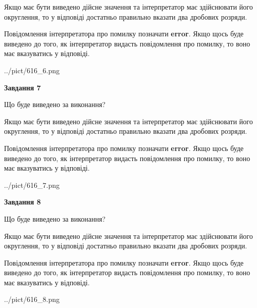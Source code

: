\documentclass[12pt, ukrainian]{article}
\begin{document}
{\begin {Large}
Якщо має бути виведено дійсне значення та інтерпретатор має здійснювати його округлення, 
то у відповіді достатньо правильно вказати два дробових розряди.

Повідомлення інтерпретатора про помилку позначати \textbf{error}.
Якщо щось буде виведено до того, як інтерпретатор видасть повідомлення про помилку, 
то воно має вказуватись у відповіді. \par

\begin{center}
	{../pict/616_6.png}
\end{center}
\newpage

{\begin {center}\textbf{Завдання 7}\end {center}}\par
Що буде виведено за виконання? \par

Якщо має бути виведено дійсне значення та інтерпретатор має здійснювати його округлення, 
то у відповіді достатньо правильно вказати два дробових розряди.

Повідомлення інтерпретатора про помилку позначати \textbf{error}.
Якщо щось буде виведено до того, як інтерпретатор видасть повідомлення про помилку, 
то воно має вказуватись у відповіді. \par

\begin{center}
	{../pict/616_7.png}
\end{center}
\newpage

{\begin {center}\textbf{Завдання 8}\end {center}}\par
Що буде виведено за виконання? \par

Якщо має бути виведено дійсне значення та інтерпретатор має здійснювати його округлення, 
то у відповіді достатньо правильно вказати два дробових розряди.

Повідомлення інтерпретатора про помилку позначати \textbf{error}.
Якщо щось буде виведено до того, як інтерпретатор видасть повідомлення про помилку, 
то воно має вказуватись у відповіді. \par

\begin{center}
	{../pict/616_8.png}
\end{center}
\newpage


\end{Large}}
\end{document}
